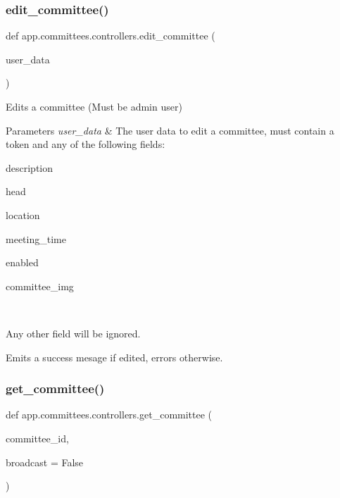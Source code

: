 \subsubsection{\texorpdfstring{edit\+\_\+committee()}{edit\_committee()}}
{\footnotesize\ttfamily def app.\+committees.\+controllers.\+edit\+\_\+committee (\begin{DoxyParamCaption}\item[{}]{user\+\_\+data }\end{DoxyParamCaption})}



Edits a committee (Must be admin user) 


\begin{DoxyParams}{Parameters}
{\em user\+\_\+data} & The user data to edit a committee, must contain a token and any of the following fields\+:
\begin{DoxyItemize}
\item description
\item head
\item location
\item meeting\+\_\+time
\item enabled
\item committee\+\_\+img
\end{DoxyItemize}\\
\hline
\end{DoxyParams}
Any other field will be ignored.

Emits a success mesage if edited, errors otherwise. \mbox{\label{namespaceapp_1_1committees_1_1controllers_a85c678c4dc91cc884de63f2a7d8b3b52}} 
\subsubsection{\texorpdfstring{get\+\_\+committee()}{get\_committee()}}
{\footnotesize\ttfamily def app.\+committees.\+controllers.\+get\+\_\+committee (\begin{DoxyParamCaption}\item[{}]{committee\+\_\+id,  }\item[{}]{broadcast = {\ttfamily False} }\end{DoxyParamCaption})}



